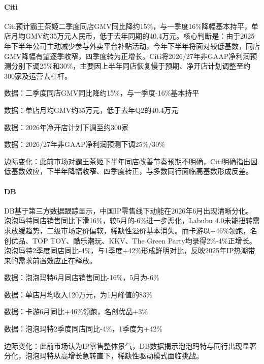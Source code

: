 \documentclass[11pt]{ctexart}
\begin{document}
\paragraph{Citi} Citi预计霸王茶姬二季度同店GMV同比降约15\%，与一季度16\%降幅基本持平，单店月均GMV约35万元人民币，低于去年同期的40.4万元。核心判断是：由于2025年下半年公司主动减少参与外卖平台补贴活动，今年下半年将面对较低基数，同店GMV降幅有望逐季收窄，四季度转为正增长。Citi将2026/27年非GAAP净利润预测分别下调25\%和30\%，主要因上半年同店恢复慢于预期、净开店计划调整至约300家及运营去杠杆。
{\small\color{refgray}数据：二季度同店GMV同比降约15\%，与一季度-16\%基本持平\par}
{\small\color{refgray}数据：单店月均GMV约35万元，低于去年Q2的40.4万元\par}
{\small\color{refgray}数据：2026年净开店计划下调至约300家\par}
{\small\color{refgray}数据：2026/27年非GAAP净利润预测下调25\%/30\%\par}
{\small\color{refgray}边际变化：此前市场对霸王茶姬下半年同店改善节奏预期不明确，Citi明确指出因低基数效应，下半年降幅收窄、四季度转正，与多数同行面临高基数形成反差。\par}
\paragraph{DB} DB基于第三方数据跟踪显示，中国IP零售线下动能在2026年6月出现清晰分化。泡泡玛特同店销售同比下滑16\%，较5月的-6\%进一步恶化，Labubu 4.0未能扭转需求放缓趋势，二级市场定价偏软，稀缺性溢价基本消失。而卡游以+46\%领跑，名创优品、TOP TOY、酷乐潮玩、KKV、The Green Party均录得2\%-4\%正增长。泡泡玛特2季度同店同比-4\%，与1季度+42\%形成鲜明对比，反映2025年IP热潮带来的需求前置效应正在释放。
{\small\color{refgray}数据：泡泡玛特6月同店销售同比-16\%，5月为-6\%\par}
{\small\color{refgray}数据：单店月均收入120万元，为1月峰值的83\%\par}
{\small\color{refgray}数据：卡游6月同比+46\%领跑，名创优品+3\%\par}
{\small\color{refgray}数据：泡泡玛特2季度同店同比-4\%，1季度为+42\%\par}
{\small\color{refgray}边际变化：此前市场认为IP零售整体景气，DB数据揭示泡泡玛特与同行出现显著分化，泡泡玛特从高增长急转直下，稀缺性驱动模式面临挑战。\par}
\end{document}
